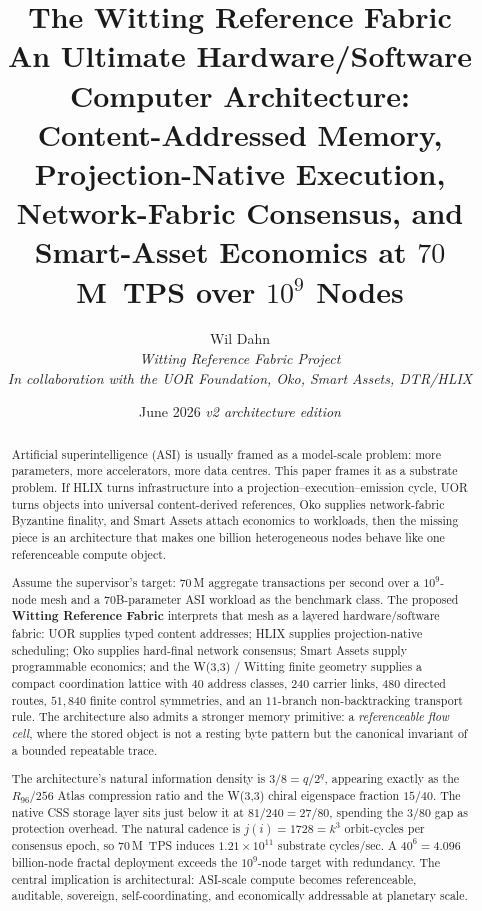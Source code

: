 \documentclass[11pt,letterpaper]{article}
\title{\vspace{-1.3cm}\textbf{The Witting Reference Fabric}\\[3pt]
\Large An Ultimate Hardware/Software Computer Architecture:\\
Content-Addressed Memory, Projection-Native Execution,\\
Network-Fabric Consensus, and Smart-Asset Economics at $70$M~TPS over $10^9$ Nodes}
\author{Wil Dahn\\
\normalsize\textit{Witting Reference Fabric Project}\\
\normalsize\textit{In collaboration with the UOR Foundation, Oko, Smart Assets, DTR/HLIX}}
\date{June 2026 \hspace{1em}\textit{v2 architecture edition}}
\theoremstyle{remark}
\begin{document}
\maketitle

\vspace{-0.6cm}
\begin{abstract}
\noindent
Artificial superintelligence (ASI) is usually framed as a model-scale problem: more
parameters, more accelerators, more data centres. This paper frames it as a substrate
problem. If HLIX turns infrastructure into a projection--execution--emission cycle, UOR
turns objects into universal content-derived references, Oko supplies network-fabric
Byzantine finality, and Smart Assets attach economics to workloads, then the missing
piece is an architecture that makes one billion heterogeneous nodes behave like one
referenceable compute object.

Assume the supervisor's target: $70$\,M aggregate transactions per second over a
$10^9$-node mesh and a $70$B-parameter ASI workload as the benchmark class. The proposed
\textbf{Witting Reference Fabric} interprets that mesh as a layered hardware/software
fabric: UOR supplies typed content addresses; HLIX supplies projection-native scheduling;
Oko supplies hard-final network consensus; Smart Assets supply programmable economics;
and the W(3,3) / Witting finite geometry supplies a compact coordination lattice with
$40$ address classes, $240$ carrier links, $480$ directed routes, $51{,}840$ finite
control symmetries, and an $11$-branch non-backtracking transport rule. The architecture
also admits a stronger memory primitive: a \emph{referenceable flow cell}, where the
stored object is not a resting byte pattern but the canonical invariant of a bounded
repeatable trace.

The architecture's natural information density is $\boxed{3/8 = q/2^q}$, appearing
exactly as the $R_{96}/256$ Atlas compression ratio and the W(3,3) chiral eigenspace
fraction $15/40$. The native CSS storage layer sits just below it at
$81/240 = 27/80$, spending the $3/80$ gap as protection overhead. The natural cadence is
$j(i)=1728=k^3$ orbit-cycles per
consensus epoch, so $70$\,M~TPS induces $1.21\times 10^{11}$ substrate cycles/sec. A
$40^6 = 4.096$ billion-node fractal deployment exceeds the $10^9$-node target with
redundancy. The central implication is architectural: ASI-scale compute becomes
referenceable, auditable, sovereign, self-coordinating, and economically addressable at
planetary scale.
\end{abstract}
\end{document}
